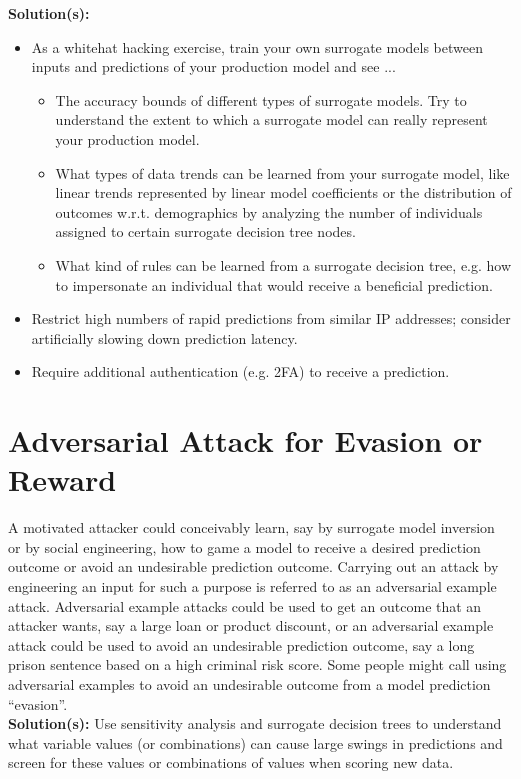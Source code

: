 \documentclass[fleqn]{article}
\begin{document}
\noindent\textbf{Solution(s):}
\begin{itemize}
\item As a whitehat hacking exercise, train your own surrogate models between inputs and predictions of your production model and see ...
	\begin{itemize}
	\item The accuracy bounds of different types of surrogate models. Try to understand the extent to which a surrogate model can really represent your production model. 
	\item What types of data trends can be learned from your surrogate model, like linear trends represented by linear model coefficients or the distribution of outcomes w.r.t. demographics by analyzing the number of individuals assigned to certain surrogate decision tree nodes.
	\item What kind of rules can be learned from a surrogate decision tree, e.g. how to impersonate an individual that would receive a beneficial prediction. 
	\end{itemize}
\item Restrict high numbers of rapid predictions from similar IP addresses; consider artificially slowing down prediction latency.
\item Require additional authentication (e.g. 2FA) to receive a prediction.
\end{itemize}

\section{Adversarial Attack for Evasion or Reward}
 
A motivated attacker could conceivably learn, say by surrogate model inversion or by social engineering, how to game a model to receive a desired prediction outcome or avoid an undesirable prediction outcome. Carrying out an attack by engineering an input for such a purpose is referred to as an adversarial example attack. Adversarial example attacks could be used to get an outcome that an attacker wants, say a large loan or product discount, or an adversarial example attack could be used to avoid an undesirable prediction outcome, say a long prison sentence based on a high criminal risk score. Some people might call using adversarial examples to avoid an undesirable outcome from a model prediction ``evasion''.\\

\noindent\textbf{Solution(s):} Use sensitivity analysis and surrogate decision trees to understand what variable values (or combinations) can cause large swings in predictions and screen for these values or combinations of values when scoring new data.
\end{document}
